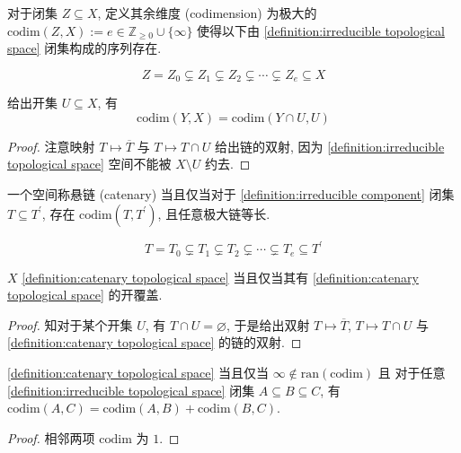 \begin{definition}[余维度]
    \label {definition:codimension}
    对于闭集 \(Z \subseteq X\), 定义其余维度 (codimension) 为极大的 \(\mathrm{codim} (Z,X) := e \in \mathbb{Z}_{\geq 0} \cup \{\infty\}\) 
    使得以下由 \ref{definition:irreducible topological space} 闭集构成的序列存在.

    \[
        Z = Z_0 \subsetneq Z_1 \subsetneq Z_2 \subsetneq \cdots \subsetneq Z_e \subseteq X
    \]
\end{definition}

\begin{lemma}
    \label {lemma:codimension in open sets}
    给出开集 \(U \subseteq X\), 有
    \[
        \mathrm{codim} (Y,X) = \mathrm{codim} (Y \cap U, U)
    \]

    \begin{proof}
        注意映射 \(T \mapsto \overline{T}\) 与 \(T \mapsto T \cap U\) 给出链的双射, 因为 \ref{definition:irreducible topological space} 空间不能被 \(X \setminus U\) 约去.
    \end{proof}
\end{lemma}

\begin{definition}[悬链空间]
    \label {definition:catenary topological space}
    一个空间称悬链 (catenary) 当且仅当对于 \ref{definition:irreducible component} 闭集 \(T \subseteq T^\prime\), 存在 \(\mathrm{codim} (T, T^\prime)\),
    且任意极大链等长.

    \[
        T = T_0 \subsetneq T_1 \subsetneq T_2 \subsetneq \cdots \subsetneq T_e \subseteq T^\prime
    \]
\end{definition}

\begin{lemma}
    \(X\) \ref{definition:catenary topological space} 当且仅当其有 \ref{definition:catenary topological space} 的开覆盖.

    \begin{proof}
        知对于某个开集 \(U\), 有 \(T \cap U = \varnothing\), 于是给出双射 \(T \mapsto \overline{T}\),
        \(T \mapsto T \cap U\) 与 \ref{definition:catenary topological space} 的链的双射.
    \end{proof}
\end{lemma}

\begin{lemma}
    \ref{definition:catenary topological space} 当且仅当 \(\infty \notin \mathrm{ran} (\mathrm{codim})\) 且
    对于任意 \ref{definition:irreducible topological space} 闭集 \(A \subseteq B \subseteq C\), 有 \(\mathrm{codim} (A,C) = \mathrm{codim} (A,B) + \mathrm{codim} (B,C)\).

    \begin{proof}
        相邻两项 \(\mathrm{codim}\) 为 \(1\).
    \end{proof}
\end{lemma}

